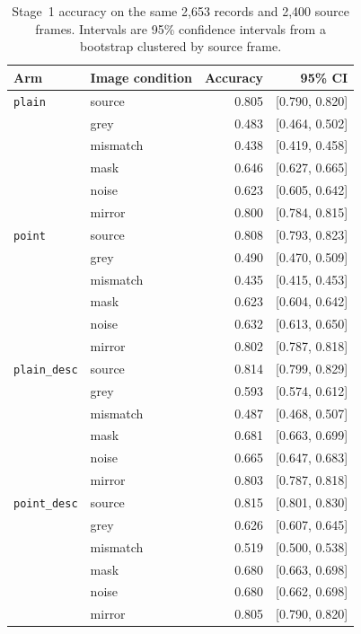 \begin{table}[ht]
\centering
\caption[Stage~1 accuracy by image condition]{Stage~1 accuracy on the same
2,653 records and 2,400 source frames. Intervals are 95\% confidence intervals
from a bootstrap clustered by source frame.}
\label{tab:rq1-battery}
\begin{tabular}{llrr}
\toprule
Arm & Image condition & Accuracy & 95\% CI \\
\midrule
\texttt{plain} & source & 0.805 & [0.790, 0.820] \\
 & grey & 0.483 & [0.464, 0.502] \\
 & mismatch & 0.438 & [0.419, 0.458] \\
 & mask & 0.646 & [0.627, 0.665] \\
 & noise & 0.623 & [0.605, 0.642] \\
 & mirror & 0.800 & [0.784, 0.815] \\
\texttt{point} & source & 0.808 & [0.793, 0.823] \\
 & grey & 0.490 & [0.470, 0.509] \\
 & mismatch & 0.435 & [0.415, 0.453] \\
 & mask & 0.623 & [0.604, 0.642] \\
 & noise & 0.632 & [0.613, 0.650] \\
 & mirror & 0.802 & [0.787, 0.818] \\
\texttt{plain\_desc} & source & 0.814 & [0.799, 0.829] \\
 & grey & 0.593 & [0.574, 0.612] \\
 & mismatch & 0.487 & [0.468, 0.507] \\
 & mask & 0.681 & [0.663, 0.699] \\
 & noise & 0.665 & [0.647, 0.683] \\
 & mirror & 0.803 & [0.787, 0.818] \\
\texttt{point\_desc} & source & 0.815 & [0.801, 0.830] \\
 & grey & 0.626 & [0.607, 0.645] \\
 & mismatch & 0.519 & [0.500, 0.538] \\
 & mask & 0.680 & [0.663, 0.698] \\
 & noise & 0.680 & [0.662, 0.698] \\
 & mirror & 0.805 & [0.790, 0.820] \\
\bottomrule
\end{tabular}
\end{table}

